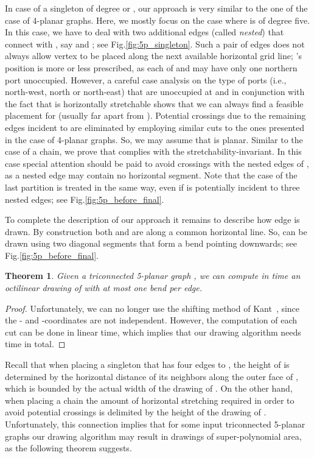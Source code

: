 \documentclass[a4paper,twoside,11pt]{article}
\newtheorem{theorem}{Theorem}
\begin{document}
In case of a singleton  of degree  or , our
approach is very similar to the one of the case of 4-planar graphs.
Here, we mostly focus on the case where  is of degree five. In
this case, we have to deal with two additional edges (called
\emph{nested}) that connect  with , say  and
; see Fig.\ref{fig:5p_singleton}. Such a pair of edges
does not always allow vertex  to be placed along the next
available horizontal grid line; 's position is more or less
prescribed, as each of  and  may have only one northern  port
unoccupied. However, a careful case analysis on the type of ports
(i.e., north-west, north or north-east) that are unoccupied at 
and  in conjunction with the fact that  is horizontally
stretchable shows that we can always find a feasible placement for
 (usually far apart from ). Potential crossings due to
the remaining edges incident to  are eliminated by employing
similar cuts to the ones presented in the case of 4-planar graphs.
So, we may assume that  is planar. Similar to the case of a
chain, we prove that  complies with the
stretchability-invariant. In this case special attention should be
paid to avoid crossings with the nested edges of , as a nested
edge may contain no horizontal segment. Note that the case of the
last partition  is treated in the same way, even if
 is potentially incident to three nested edges; see
Fig.\ref{fig:5p_before_final}.

To complete the description of our approach it remains to describe
how edge  is drawn. By construction both  and 
are along a common horizontal line. So,  can be drawn
using two diagonal segments that form a bend pointing downwards; see
Fig.\ref{fig:5p_before_final}.

\begin{theorem}
Given a triconnected 5-planar graph , we can compute in 
time an octilinear drawing of  with at most one bend per edge.
\end{theorem}
\begin{proof}
Unfortunately, we can no longer use the shifting method of
Kant~\cite{Kant92b}, since the - and -coordinates are not
independent. However, the computation of each cut can be done in
linear time, which implies that our drawing algorithm needs 
time in total.
\end{proof}

Recall that when placing a singleton  that
has four edges to , the height of  is determined by
the horizontal distance of its neighbors along the outer face of
, which is bounded by the actual width of the drawing of
. On the other hand, when placing a chain  the amount
of horizontal stretching required in order to avoid potential
crossings is delimited by the height of the drawing of .
Unfortunately, this connection implies that for some input
triconnected 5-planar graphs our drawing algorithm may result in
drawings of super-polynomial area, as the following theorem
suggests.
\end{document}
